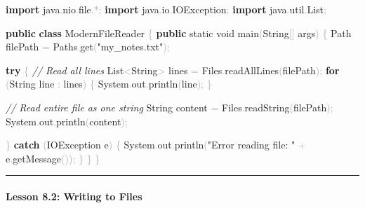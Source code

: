 \documentclass[
  justified,
  openright,
]{tufte-book}
\let\subsection\paragraph
\let\paragraph\paragraph
\newcommand{\KeywordTok}[1]{\textcolor{CodeKeyword}{\textbf{#1}}}  %
\newcommand{\StringTok}[1]{\textcolor{CodeString}{#1}}              %
\newcommand{\CommentTok}[1]{\textcolor{CodeComment}{\textit{#1}}}  %
\newcommand{\CodeFuncTok}[1]{\textcolor{CodeKeyword}{#1}}           %
\newcommand{\CodeTypeTok}[1]{\textcolor{CodeType}{#1}}              %
\newcommand{\CodeAccentTok}[1]{\textcolor{CodeAccent}{#1}}          %
\newcommand{\OperatorTok}[1]{\textcolor{DarkGray}{#1}}              %
\newenvironment{Shaded}{%
  \begin{mdframed}[style=TufteCode]%
}{%
  \end{mdframed}%
}
\let\subsection\paragraph
\let\paragraph\paragraph
\begin{document}
\begin{Shaded}
\begin{Highlighting}[]
\KeywordTok{import} \CodeAccentTok{java}\OperatorTok{.}\CodeAccentTok{nio}\OperatorTok{.}\CodeAccentTok{file}\OperatorTok{.*;}
\KeywordTok{import} \CodeAccentTok{java}\OperatorTok{.}\CodeAccentTok{io}\OperatorTok{.}\CodeAccentTok{IOException}\OperatorTok{;}
\KeywordTok{import} \CodeAccentTok{java}\OperatorTok{.}\CodeAccentTok{util}\OperatorTok{.}\CodeAccentTok{List}\OperatorTok{;}
 
\KeywordTok{public} \KeywordTok{class} ModernFileReader \OperatorTok{\{}
    \KeywordTok{public} \CodeTypeTok{static} \CodeTypeTok{void} \CodeFuncTok{main}\OperatorTok{(}String\OperatorTok{[]} args\OperatorTok{)} \OperatorTok{\{}
        Path filePath \OperatorTok{=} Paths\OperatorTok{.}\CodeFuncTok{get}\OperatorTok{(}\StringTok{"my\_notes.txt"}\OperatorTok{);}
 
        \KeywordTok{try} \OperatorTok{\{}
            \CommentTok{// Read all lines}
            List\OperatorTok{\textless{}}String\OperatorTok{\textgreater{}} lines \OperatorTok{=} Files\OperatorTok{.}\CodeFuncTok{readAllLines}\OperatorTok{(}filePath\OperatorTok{);}
            \KeywordTok{for} \OperatorTok{(}String line \OperatorTok{:} lines\OperatorTok{)} \OperatorTok{\{}
                System\OperatorTok{.}\CodeFuncTok{out}\OperatorTok{.}\CodeFuncTok{println}\OperatorTok{(}line\OperatorTok{);}
            \OperatorTok{\}}
 
            \CommentTok{// Read entire file as one string}
            String content \OperatorTok{=} Files\OperatorTok{.}\CodeFuncTok{readString}\OperatorTok{(}filePath\OperatorTok{);}
            System\OperatorTok{.}\CodeFuncTok{out}\OperatorTok{.}\CodeFuncTok{println}\OperatorTok{(}content\OperatorTok{);}
 
        \OperatorTok{\}} \KeywordTok{catch} \OperatorTok{(}IOException e\OperatorTok{)} \OperatorTok{\{}
            System\OperatorTok{.}\CodeFuncTok{out}\OperatorTok{.}\CodeFuncTok{println}\OperatorTok{(}\StringTok{"Error reading file: "} \OperatorTok{+} e\OperatorTok{.}\CodeFuncTok{getMessage}\OperatorTok{());}
        \OperatorTok{\}}
    \OperatorTok{\}}
\OperatorTok{\}}
\end{Highlighting}
\end{Shaded}

\begin{center}\rule{0.5\linewidth}{0.5pt}\end{center}

\subsection{Lesson 8.2: Writing to
Files}\label{lesson-8.2-writing-to-files}
\end{document}
